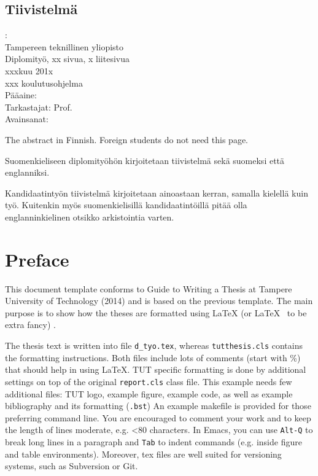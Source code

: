 \documentclass[12pt,a4paper,english
]{tutthesis}
\begin{document}
\begin{otherlanguage}{finnish} %
\chapter*{Tiivistelmä} %

\begin{spacing}{1.0}
         {\bf \textsf{\MakeUppercase{\@author}}}: \@titleB\\  %
         \textsf{Tampereen teknillinen yliopisto}\\
         \textsf{Diplomityö, xx sivua, x liitesivua}\\ %
         \textsf{xxxkuu 201x}\\
         \textsf{xxx koulutusohjelma}\\
         \textsf{Pääaine: }\\
         \textsf{Tarkastajat:  Prof. \@examiner}\\ %
         \textsf{Avainsanat: }\\
\end{spacing}

The abstract in Finnish. Foreign students do not need this page.

Suomenkieliseen diplomityöhön kirjoitetaan tiivistelmä sekä suomeksi
että englanniksi.

Kandidaatintyön tiivistelmä kirjoitetaan ainoastaan kerran, samalla
kielellä kuin työ. Kuitenkin myös suomenkielisillä kandidaatintöillä
pitää olla englanninkielinen otsikko arkistointia varten.

\end{otherlanguage} %


\chapter*{Preface}

This document template conforms to Guide to Writing a Thesis at
Tampere University of Technology (2014) and is based on the previous
template. The main purpose is to show how the theses are formatted
using LaTeX (or \LaTeX ~ to be extra fancy) .

The thesis text is written into file \texttt{d\_tyo.tex}, whereas
\texttt{tutthesis.cls} contains the formatting instructions. Both
files include lots of comments (start with \%) that should help in
using LaTeX. TUT specific formatting is done by additional settings on
top of the original \texttt{report.cls} class file. This example needs
few additional files: TUT logo, example figure, example code, as well
as example bibliography and its formatting (\texttt{.bst}) An example
makefile is provided for those preferring command line. You are
encouraged to comment your work and to keep the length of lines
moderate, e.g. <80 characters. In Emacs, you can use \texttt{Alt-Q} to
break long lines in a paragraph and \texttt{Tab} to indent commands
(e.g. inside figure and table environments). Moreover, tex files are
well suited for versioning systems, such as Subversion or Git.  
\end{document}
